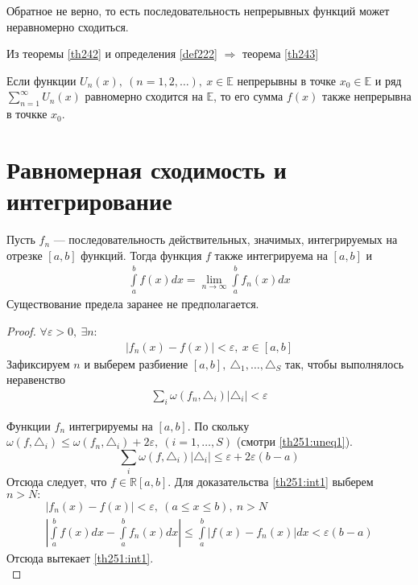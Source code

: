 \begin{remark}
  Обратное не верно, то есть последовательность непрерывных функций может
  неравномерно сходиться.
\end{remark}

Из теоремы \ref{th242} и определения \ref{def222} $\Rightarrow$ теорема \ref{th243}

\begin{theorem}
  \label{th243}
  Если функции $U_n(x), \ (n = 1, 2, \dots), \ x \in \mathbb{E}$ непрерывны
  в точке $x_0 \in \mathbb{E}$ и ряд $\sum\limits_{n = 1}^{\infty} U_n(x)$
  равномерно сходится на $\mathbb{E}$, то его сумма $f(x)$ также непрерывна
  в точкке $x_0$.
\end{theorem}

\section{Равномерная сходимость и интегрирование}
\begin{theorem}
  \label{th251}
  Пусть $f_n$ --- последовательность действительных, значимых, интегрируемых на
  отрезке $[a, b]$ функций. Тогда функция $f$ также интегрируема на $[a,b]$ и
  \begin{gather}
    \int\limits_a^b f(x) dx = \lim\limits_{n \to \infty} \int\limits_a^b f_n(x) dx
    \label{th251:int1}
  \end{gather}
  Существование предела заранее не предполагается.
\end{theorem}

\begin{proof}
  $\forall \varepsilon > 0, \ \exists n:$
  \begin{gather}
    |f_n(x) - f(x)| < \varepsilon, \ x \in [a,b] \label{th251:uneq1}
  \end{gather}
  Зафиксируем $n$ и выберем разбиение
  $[a,b], \ \triangle_1, \dots, \triangle_S$ так, чтобы выполнялось неравенство
  \begin{gather}
    \sum_i \omega(f_n, \triangle_i) |\triangle_i| < \varepsilon \label{th251:sum1}
  \end{gather}
  \begin{comment}
    $\omega(f, E) = \sup - \inf$ --- колебание функции.
  \end{comment}
  Функции $f_n$ интегрируемы на $[a,b]$. По скольку
  $\omega(f, \triangle_i) \leq \omega(f_n, \triangle_i) + 2 \varepsilon,  \ (i = 1, \dots, S)$
  (смотри \ref{th251:uneq1}).
  $$\sum_i \omega(f, \triangle_i)|\triangle_i| \leq \varepsilon + 2\varepsilon (b - a)$$
  Отсюда следует, что $f \in \mathbb{R} [a,b]$. Для доказательства \ref{th251:int1}
  выберем $n > N: $
  \begin{gather*}
    |f_n(x) - f(x)| < \varepsilon, \ (a \leq x \leq b), \ n > N \\
    \left|\int\limits_a^b f(x) dx - \int\limits_a^b f_n(x) dx\right| \leq
    \int\limits_a^b |f(x) - f_n(x)| dx < \varepsilon(b - a)
  \end{gather*}
  Отсюда вытекает \ref{th251:int1}. \\
\end{proof}

